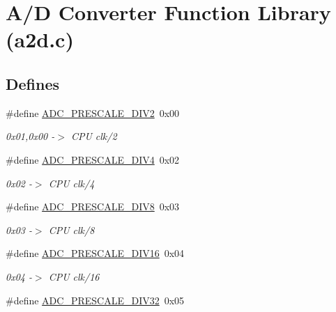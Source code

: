 \hypertarget{group__a2d}{
\section{A/D Converter Function Library (a2d.c)}
\label{group__a2d}
}
\subsection*{Defines}
\begin{CompactItemize}
\item 
\hypertarget{group__a2d_g94b219194cddc9869031a936b94bf536}{
\#define \hyperlink{group__a2d_g94b219194cddc9869031a936b94bf536}{ADC\_\-PRESCALE\_\-DIV2}~0x00}
\label{group__a2d_g94b219194cddc9869031a936b94bf536}

\begin{CompactList}\small\item\em 0x01,0x00 -$>$ CPU clk/2 \item\end{CompactList}\item 
\hypertarget{group__a2d_g03ae0e14f20d17c74a4a539b7522328a}{
\#define \hyperlink{group__a2d_g03ae0e14f20d17c74a4a539b7522328a}{ADC\_\-PRESCALE\_\-DIV4}~0x02}
\label{group__a2d_g03ae0e14f20d17c74a4a539b7522328a}

\begin{CompactList}\small\item\em 0x02 -$>$ CPU clk/4 \item\end{CompactList}\item 
\hypertarget{group__a2d_gfc060b8cc9bc407394efc98930dd9b06}{
\#define \hyperlink{group__a2d_gfc060b8cc9bc407394efc98930dd9b06}{ADC\_\-PRESCALE\_\-DIV8}~0x03}
\label{group__a2d_gfc060b8cc9bc407394efc98930dd9b06}

\begin{CompactList}\small\item\em 0x03 -$>$ CPU clk/8 \item\end{CompactList}\item 
\hypertarget{group__a2d_g588a7712025228700d3331fbb60b4aea}{
\#define \hyperlink{group__a2d_g588a7712025228700d3331fbb60b4aea}{ADC\_\-PRESCALE\_\-DIV16}~0x04}
\label{group__a2d_g588a7712025228700d3331fbb60b4aea}

\begin{CompactList}\small\item\em 0x04 -$>$ CPU clk/16 \item\end{CompactList}\item 
\hypertarget{group__a2d_gb3fd1406c04d98209cc1c17c77b8619a}{
\#define \hyperlink{group__a2d_gb3fd1406c04d98209cc1c17c77b8619a}{ADC\_\-PRESCALE\_\-DIV32}~0x05}
\label{group__a2d_gb3fd1406c04d98209cc1c17c77b8619a}


\end{CompactItemize}
